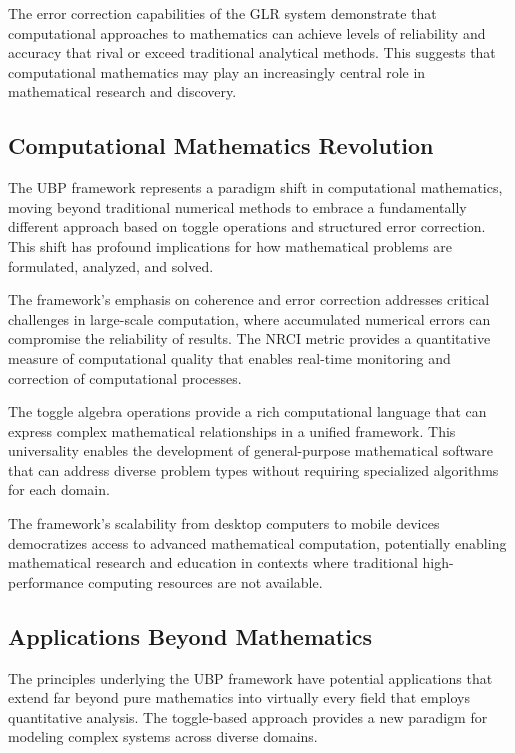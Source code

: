 \documentclass[11pt]{amsart}
\begin{document}
The error correction capabilities of the GLR system demonstrate that computational approaches to mathematics can achieve levels of reliability and accuracy that rival or exceed traditional analytical methods. This suggests that computational mathematics may play an increasingly central role in mathematical research and discovery.

\subsection{Computational Mathematics Revolution}

The UBP framework represents a paradigm shift in computational mathematics, moving beyond traditional numerical methods to embrace a fundamentally different approach based on toggle operations and structured error correction. This shift has profound implications for how mathematical problems are formulated, analyzed, and solved.

The framework's emphasis on coherence and error correction addresses critical challenges in large-scale computation, where accumulated numerical errors can compromise the reliability of results. The NRCI metric provides a quantitative measure of computational quality that enables real-time monitoring and correction of computational processes.

The toggle algebra operations provide a rich computational language that can express complex mathematical relationships in a unified framework. This universality enables the development of general-purpose mathematical software that can address diverse problem types without requiring specialized algorithms for each domain.

The framework's scalability from desktop computers to mobile devices democratizes access to advanced mathematical computation, potentially enabling mathematical research and education in contexts where traditional high-performance computing resources are not available.

\subsection{Applications Beyond Mathematics}

The principles underlying the UBP framework have potential applications that extend far beyond pure mathematics into virtually every field that employs quantitative analysis. The toggle-based approach provides a new paradigm for modeling complex systems across diverse domains.
\end{document}
